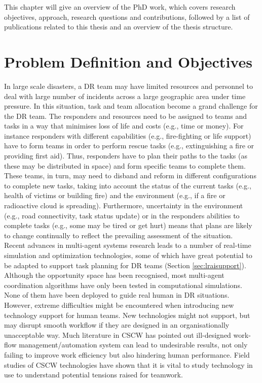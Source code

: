 This chapter will give an overview of the PhD work, which covers research objectives, approach, research questions and contributions, followed by a list of publications related to this thesis and an overview of the thesis structure.\\


\section{Problem Definition and Objectives}
In large scale disasters, a \ac{DR} team may have limited resources and personnel to deal with large number of incidents across a large geographic area under time pressure. In this situation, task and team allocation become a grand challenge for the \ac{DR} team. The responders and resources need to be assigned to teams and tasks in a way that minimises loss of life and costs (e.g., time or money). For instance responders with different capabilities (e.g., fire-fighting or life support) have to form teams in order to perform rescue tasks (e.g., extinguishing a fire or providing first aid). Thus, responders have to plan their paths to the tasks (as these may be distributed in space) and form specific teams to complete them. These teams, in turn, may need to disband and reform in different configurations to complete new tasks, taking into account the status of the current tasks (e.g., health of victims or building fire) and the environment (e.g., if a fire or radioactive cloud is spreading). Furthermore, uncertainty in the environment (e.g., road connectivity, task status update) or in the responders abilities to complete tasks (e.g., some may be tired or get hurt) means that plans are likely to change continually to reflect the prevailing assessment of the situation.\\

Recent advances in multi-agent systems research leads to a number of real-time simulation and optimization technologies, some of which have great potential to be adapted to support task planning for \ac{DR} teams (Section \ref{sec:lraisupport}). Although the opportunity space has been recognised, most multi-agent coordination algorithms have only been tested in computational simulations. None of them have been deployed to guide real human in \ac{DR} situations. However, extreme difficulties might be encountered when introducing new technology support for human teams. New technologies might not support, but may disrupt smooth workflow if they are designed in an organisationally unacceptable way. Much literature in \ac{CSCW} has pointed out ill-designed work-flow management/automation system can lead to undesirable results, not only failing to improve work efficiency but also hindering human performance. Field studies of \ac{CSCW} technologies have shown that it is vital to study technology in use to understand potential tensions raised for teamwork. \\

